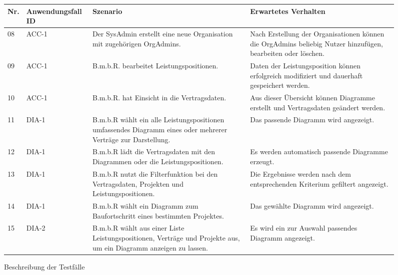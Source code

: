 \begin{figure}[!h]
	\begin{center}
		\begin{tabularx}{\textwidth}{ p{} | p{} | p{} | X }
			\textbf{Nr.} & \textbf{Anwendungsfall ID} & \textbf{Szenario} & \textbf{Erwartetes Verhalten} \\ \hline
			
			
			08 & ACC-1 & Der SysAdmin erstellt eine neue Organisation mit zugehörigen OrgAdmins. & Nach Erstellung der Organisationen können die OrgAdmins beliebig Nutzer hinzufügen, bearbeiten oder löschen. \\ \hline
			09 & ACC-1 & B.m.b.R. bearbeitet Leistungspositionen. & Daten der Leistungsposition können erfolgreich modifiziert und dauerhaft gespeichert werden. \\ \hline
			10 & ACC-1 & B.m.b.R. hat Einsicht in die Vertragsdaten. & Aus dieser Übersicht können Diagramme erstellt und Vertragsdaten geändert werden. \\ \hline
			11 & DIA-1 & B.m.b.R wählt ein alle Leistungspositionen umfassendes Diagramm eines oder mehrerer Verträge zur Darstellung. & Das passende Diagramm wird angezeigt. \\ \hline 
			12 & DIA-1 & B.m.b.R lädt die Vertragsdaten mit den Diagrammen oder die Leistungspositionen. & Es werden automatisch passende Diagramme erzeugt. \\ \hline
			13 & DIA-1 & B.m.b.R nutzt die Filterfunktion bei den Vertragsdaten, Projekten und Leistungspositionen. & Die Ergebnisse werden nach dem entsprechenden Kriterium gefiltert angezeigt. \\ \hline
			14 & DIA-1 & B.m.b.R wählt ein Diagramm zum Baufortschritt eines bestimmten Projektes. & Das gewählte Diagramm wird angezeigt.\\ \hline
			15 & DIA-2 & B.m.b.R wählt aus einer Liste Leistungspositionen, Verträge und Projekte aus, um ein Diagramm anzeigen zu lassen.  & Es wird ein zur Auswahl passendes Diagramm angezeigt. \\ \hline 

		\end{tabularx}	
	\end{center}
	\caption{Beschreibung der Testfälle}
	\label{fig:testfaelle-mobile-app-tabelle}
\end{figure}